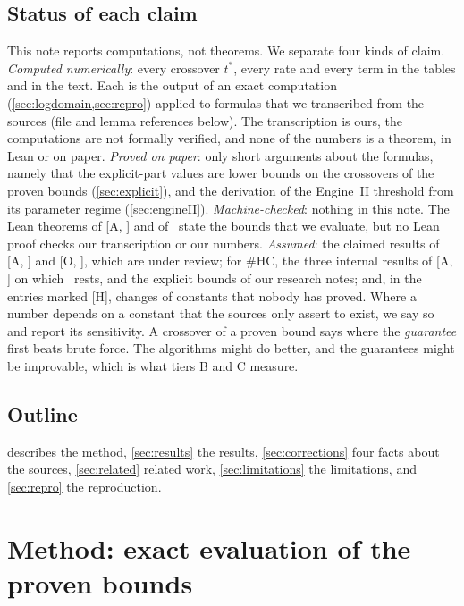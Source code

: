\documentclass[10pt]{amsart}
\theoremstyle{definition}
\theoremstyle{remark}
\numberwithin{equation}{section}
\newcommand{\A}[1][]{\textup{[A\if\relax\detokenize{#1}\relax\else, #1\fi]}}
\newcommand{\Oa}[1][]{\textup{[O\if\relax\detokenize{#1}\relax\else, #1\fi]}}
\newcommand{\HC}{\#\mathrm{HC}}
\newcommand{\tst}{t^{*}}
\newcommand{\Hh}{\textup{[H]}}
\begin{document}
\subsection{Status of each claim}
This note reports computations, not theorems. We separate four kinds of claim.
\emph{Computed numerically}: every crossover $\tst$, every rate and every term in the tables and in
the text. Each is the output of an exact computation (\cref{sec:logdomain,sec:repro}) applied to
formulas that we transcribed from the sources (file and lemma references below). The transcription
is ours, the computations are not formally verified, and none of the numbers is a theorem, in Lean or
on paper.
\emph{Proved on paper}: only short arguments about the formulas, namely that the explicit-part
values are lower bounds on the crossovers of the proven bounds (\cref{sec:explicit}), and the
derivation of the Engine~II threshold from its parameter regime (\cref{sec:engineII}).
\emph{Machine-checked}: nothing in this note. The Lean theorems of \A{} and of~\cite{Tulsyan26} state
the bounds that we evaluate, but no Lean proof checks our transcription or our numbers.
\emph{Assumed}: the claimed results of \A{} and \Oa, which are under review; for $\HC$, the three
internal results of \A{} on which~\cite{Tulsyan26} rests, and the explicit bounds of our research
notes; and, in the entries marked \Hh, changes of constants that nobody has proved.
Where a number depends on a constant that the sources only assert to exist, we say so and report its
sensitivity. A crossover of a proven bound says where the \emph{guarantee} first beats brute force.
The algorithms might do better, and the guarantees might be improvable, which is what tiers B and C
measure.

\subsection*{Outline}
 describes the method, \cref{sec:results} the results, \cref{sec:corrections} four
facts about the sources, \cref{sec:related} related work, \cref{sec:limitations} the limitations, and
\cref{sec:repro} the reproduction.

\section{Method: exact evaluation of the proven bounds}\label{sec:method}
\end{document}
